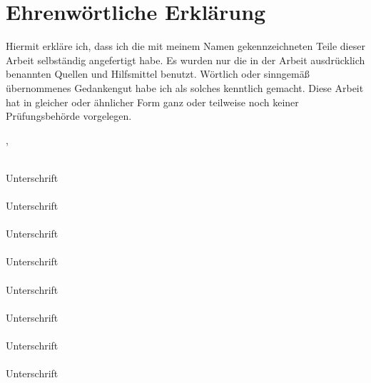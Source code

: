 
\section*{Ehrenwörtliche Erklärung}

Hiermit erkläre ich, dass ich die mit meinem Namen gekennzeichneten Teile dieser Arbeit selbständig angefertigt habe. Es wurden nur die in der Arbeit ausdrücklich benannten Quellen und Hilfsmittel benutzt. Wörtlich oder sinngemäß übernommenes Gedankengut habe ich als solches kenntlich gemacht. Diese Arbeit hat in gleicher oder ähnlicher Form ganz oder teilweise noch keiner Prüfungsbehörde vorgelegen.
\vspace{4mm}

\ort, \abgabedatum
\vspace{2mm}

\underline{\hspace{8cm}}\\ Unterschrift
\\
\underline{\hspace{8cm}}\\ Unterschrift 
\\
\underline{\hspace{8cm}}\\ Unterschrift
\\
\underline{\hspace{8cm}}\\ Unterschrift
\\
\underline{\hspace{8cm}}\\ Unterschrift
\\
\underline{\hspace{8cm}}\\ Unterschrift
\\
\underline{\hspace{8cm}}\\ Unterschrift
\\
\underline{\hspace{8cm}}\\ Unterschrift